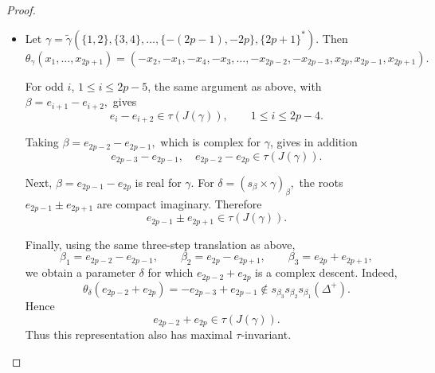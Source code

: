 \documentclass{amsart}
\theoremstyle{definition}
\newcommand{\tu}{\widetilde}
\begin{document}
\begin{proof}
\begin{itemize}
Next take
$\beta=e_{2p-1}-e_{2p}.$
This root is noncompact imaginary for \(\gamma\). For $\delta=(s_\beta\times\gamma)^\beta,$ the roots \(e_{2p-1}\pm e_{2p+1}\) are complex, and
\begin{align*}
\theta_\delta(e_{2p-1}-e_{2p+1})
&=-e_{2p-1}-e_{2p+1}
  \notin s_\beta(\Delta^+),\\
\theta_\delta(e_{2p-1}+e_{2p+1})
&=-e_{2p-1}+e_{2p+1}
  \notin s_\beta(\Delta^+).
\end{align*}
Thus
\[
e_{2p-1}\pm e_{2p+1}\in\tau(J(\gamma)).
\]

It remains to consider \(e_{2p-2}+e_{2p}\). Set
\[
w=s_{\beta_3}s_{\beta_2}s_{\beta_1},
\]
where $\beta_1=e_{2p-2}-e_{2p-1},\
\beta_2=e_{2p}-e_{2p+1},\ 
\beta_3=e_{2p}+e_{2p+1}.$

All three roots are complex at the corresponding stages, so
\[
\delta
=
s_{\beta_3}\times
\bigl(s_{\beta_2}\times(s_{\beta_1}\times\gamma)\bigr)
\]
satisfies
\[
\psi_{\beta_3}\psi_{\beta_2}\psi_{\beta_1}(J(\gamma))
=
J(\delta),
\qquad
\theta_\delta=\theta_\gamma.
\]
Since \(e_{2p-2}+e_{2p}\) is simple with respect to \(w(\Delta^+)\)
and
\[
\theta_\delta(e_{2p-2}+e_{2p})
=
-e_{2p-3}-e_{2p-1}
\notin w(\Delta^+),
\]
we obtain
\[
e_{2p-2}+e_{2p}\in\tau(J(\gamma)).
\]
Hence \(J(\gamma)\) has maximal \(\tau\)-invariant.

\item
Let $\gamma=
\tu \gamma(\{1,2\},\{3,4\},\ldots,
\{-(2p-1),-2p\},\{2p+1\}^*).$
Then
\[
\theta_\gamma(x_1,\ldots,x_{2p+1})
=
(-x_2,-x_1,-x_4,-x_3,\ldots,
-x_{2p-2},-x_{2p-3},
x_{2p},x_{2p-1},x_{2p+1}).
\]

For odd \(i\), \(1\leq i\leq2p-5\), the same argument as above,
with
$\beta=e_{i+1}-e_{i+2},$
gives
\[
e_i-e_{i+2}\in\tau(J(\gamma)),
\qquad
1\leq i\leq2p-4.
\]

Taking
$\beta=e_{2p-2}-e_{2p-1},$
which is complex for \(\gamma\), gives in addition
\[
e_{2p-3}-e_{2p-1},
\quad
e_{2p-2}-e_{2p}
\in\tau(J(\gamma)).
\]

Next, \(\beta=e_{2p-1}-e_{2p}\) is real for \(\gamma\). For
$\delta=(s_\beta\times\gamma)_\beta,$ the roots \(e_{2p-1}\pm e_{2p+1}\) are compact imaginary.
Therefore
\[
e_{2p-1}\pm e_{2p+1}\in\tau(J(\gamma)).
\]

Finally, using the same three-step translation as above,
\[
\beta_1=e_{2p-2}-e_{2p-1},\qquad
\beta_2=e_{2p}-e_{2p+1},\qquad
\beta_3=e_{2p}+e_{2p+1},
\]
we obtain a parameter \(\delta\) for which
\(e_{2p-2}+e_{2p}\) is a complex descent. Indeed,
\[
\theta_\delta(e_{2p-2}+e_{2p})
=
-e_{2p-3}+e_{2p-1}
\notin
s_{\beta_3}s_{\beta_2}s_{\beta_1}(\Delta^+).
\]
Hence
\[
e_{2p-2}+e_{2p}\in\tau(J(\gamma)).
\]
Thus this representation also has maximal \(\tau\)-invariant.


\end{itemize}
\end{proof}
\end{document}
